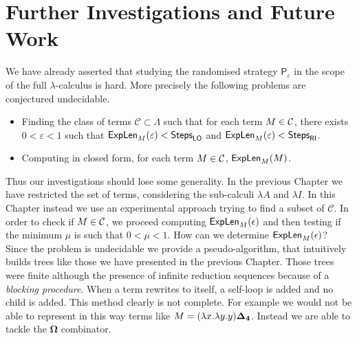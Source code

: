\chapter{Further Investigations and Future Work}
We have already asserted that studying the randomised strategy $\mathsf{P}_\varepsilon$ in the scope of the full $\lambda$-calculus is hard. More precisely the following problems are conjectured undecidable.
\begin{itemize}
	\item Finding the class of terms $\mathcal{C}\subset\Lambda$ such that for each term $M\in\mathcal{C}$, there exists $0<\varepsilon<1$ such that $\textsf{ExpLen}_{M}(\varepsilon)<\textsf{Steps}_{\textsf{LO}}$ and $\textsf{ExpLen}_{M}(\varepsilon)<\textsf{Steps}_{\textsf{RI}}$.
	\item Computing in closed form, for each term $M\in\mathcal{C}$, $\textsf{ExpLen}_{M}(M)$.
\end{itemize}
Thus our investigations should lose some generality. In the previous Chapter we have restricted the set of terms, considering the sub-calculi $\lambda A$ and $\lambda I$. In this Chapter instead we use an experimental approach trying to find a subset of $\mathcal{C}$. In order to check if $M\in\mathcal{C}$, we proceed computing $\textsf{ExpLen}_{M}(\epsilon)$ and then testing if the minimum $\mu$ is such that $0<\mu<1$. How can we determine $\textsf{ExpLen}_{M}(\epsilon)$? Since the problem is undecidable we provide a pseudo-algorithm, that intuitively builds trees like those we have presented in the previous Chapter. Those trees were finite although the presence of infinite reduction sequences because of a \emph{blocking procedure}. When a term rewrites to itself, a self-loop is added and no child is added. This method clearly is not complete. For example we would not be able to represent in this way terms like $M = (\lambda x.\lambda y.y)\bm{\Delta_4}$. Instead we are able to tackle the $\bm{\Omega}$ combinator.
